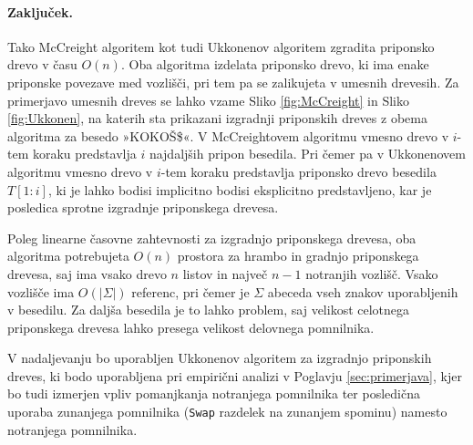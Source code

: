 \paragraph{Zaključek.}
Tako McCreight algoritem \cite{McCreight1976} kot tudi  Ukkonenov algoritem \cite{Ukkonen1995} zgradita priponsko drevo v času $O(n)$. Oba algoritma izdelata priponsko drevo, ki ima enake priponske povezave med vozlišči, pri tem pa se zalikujeta v umesnih drevesih. Za primerjavo umesnih dreves se lahko vzame Sliko \ref{fig:McCreight} in Sliko \ref{fig:Ukkonen}, na katerih sta prikazani izgradnji priponskih dreves z obema algoritma za besedo »KOKOŠ\$«. V McCreightovem algoritmu vmesno drevo v $i$-tem koraku predstavlja $i$ najdaljših pripon besedila. Pri čemer pa v Ukkonenovem algoritmu vmesno drevo v $i$-tem koraku predstavlja priponsko drevo besedila $T[1:i]$, ki je lahko bodisi implicitno bodisi eksplicitno predstavljeno, kar je posledica sprotne izgradnje priponskega drevesa.

Poleg linearne časovne zahtevnosti za izgradnjo priponskega drevesa, oba algoritma potrebujeta $O(n)$ prostora za hrambo in gradnjo priponskega drevesa, saj ima vsako drevo $n$ listov in največ $n-1$ notranjih vozlišč. Vsako vozlišče ima $O(|\Sigma|)$ referenc, pri čemer je $\Sigma$ abeceda vseh znakov uporabljenih v besedilu. Za daljša besedila je to lahko problem, saj velikost celotnega priponskega drevesa lahko presega velikost delovnega pomnilnika.

V nadaljevanju bo uporabljen Ukkonenov algoritem za izgradnjo priponskih dreves, ki bodo uporabljena pri empirični analizi v Poglavju \ref{sec:primerjava}, kjer bo tudi izmerjen vpliv pomanjkanja notranjega pomnilnika ter posledična uporaba zunanjega pomnilnika (\verb|Swap| razdelek na zunanjem spominu) namesto notranjega pomnilnika.